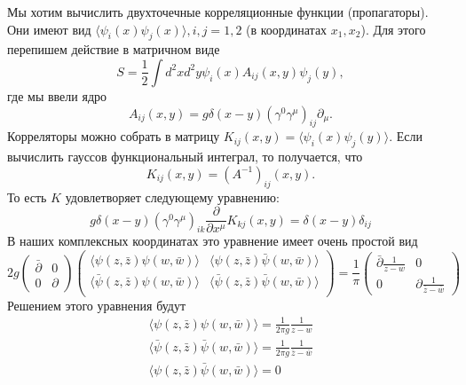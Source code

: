 \documentclass[a4paper,12pt]{article}
\theoremstyle{definition}
\theoremstyle{definition}
\theoremstyle{definition}
\begin{document}
Мы хотим вычислить двухточечные корреляционные функции (пропагаторы). Они имеют вид $\langle \psi_i(x)\psi_j(x)\rangle, i,j=1,2$ (в координатах $x_1,x_2$). Для этого перепишем действие в матричном виде
\begin{equation}
  \label{eq:288}
  S=\frac{1}{2}\int d^2x d^2 y \psi_i (x) A_{ij}(x,y) \psi_j(y),
\end{equation}
где мы ввели ядро
\begin{equation}
  \label{eq:289}
  A_{ij}(x,y)=g \delta(x-y) (\gamma^0 \gamma^{\mu})_{ij} \partial_{\mu}.
\end{equation}
 Корреляторы можно собрать в матрицу $K_{ij}(x,y)=\langle \psi_i(x)\psi_j(y)\rangle$. Если вычислить гауссов функциональный интеграл, то получается, что
 \begin{equation}
   \label{eq:290}
   K_{ij}(x,y)=\left(A^{-1}\right)_{ij}(x,y).
 \end{equation}
То есть $K$ удовлетворяет следующему уравнению:
\begin{equation}
  \label{eq:291}
  g \delta (x-y) (\gamma^0 \gamma^{\mu})_{ik} \frac{\partial}{\partial x^{\mu}} K_{kj}(x,y)=\delta(x-y)\delta_{ij}
\end{equation}
В наших комплексных координатах это уравнение имеет очень простой вид
\begin{equation}
  \label{eq:292}
  2g
  \begin{pmatrix}
    \bar \partial & 0\\
    0 & \partial
  \end{pmatrix}
  \begin{pmatrix}
    \langle \psi(z,\bar z) \psi(w,\bar w) \rangle & \langle\psi(z,\bar z)\bar \psi(w,\bar w) \rangle \\
    \langle \bar \psi(z,\bar z) \psi(w,\bar w) \rangle & \langle\bar\psi(z,\bar z)\bar \psi(w,\bar w) \rangle \\    
  \end{pmatrix}=
  \frac{1}{\pi}
  \begin{pmatrix}
    \bar \partial\frac{1}{z-w} & 0\\
    0 & \partial \frac{1}{\bar z-\bar w}
  \end{pmatrix}
\end{equation}
Решением этого уравнения будут
\begin{eqnarray}
  \label{eq:293}
  \langle \psi(z,\bar z) \psi(w,\bar w) \rangle=\frac{1}{2\pi g} \frac{1}{z-w}\\
  \langle\bar\psi(z,\bar z) \bar \psi(w,\bar w) \rangle =\frac{1}{2\pi g} \frac{1}{\bar z-\bar w}\\
  \langle\psi(z,\bar z) \bar \psi(w,\bar w) \rangle =0
\end{eqnarray}
\end{document}
